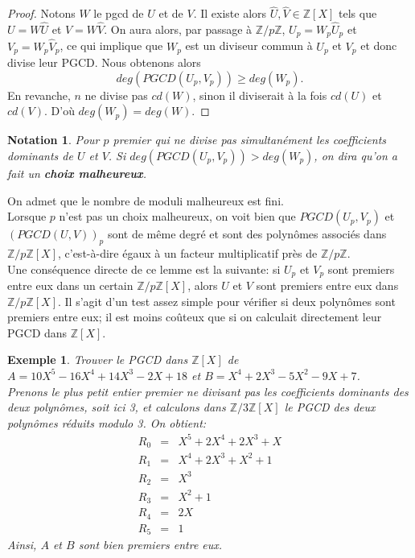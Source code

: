 \documentclass[10pt,a4paper]{report}
\newtheorem*{ex}{Exemple}
\newtheorem*{nota}{Notation}
\begin{document}
\begin{proof}
Notons $W$ le pgcd de $U$ et de $V$. Il existe alors $\widehat{U},\widehat{V} \in \mathbb{Z}[X]$ tels que $U=W\widehat{U} $ et $V=W\widehat{V}$. On aura alors, par passage à $\mathbb{Z}/p\mathbb{Z}$, $U_p=W_p\widehat{U}_p $ et $V_p=W_p\widehat{V}_p$, ce qui implique que $W_p$ est un diviseur commun à $U_p$ et $V_p$ et donc divise leur PGCD. Nous obtenons alors
$$ deg (PGCD(U_p,V_p) ) \geqslant deg (W_p).       $$
En revanche, $n$ ne divise pas $cd(W)$, sinon il diviserait à la fois $cd(U)$ et $cd(V)$. D'où $deg(W_p)=deg(W)$.
\end{proof}



\begin{nota}
Pour $p$ premier qui ne divise pas simultanément les coefficients dominants de $U$ et $V$. Si $deg (PGCD(U_p,V_p) ) > deg (W_p)$, on dira qu'on a fait un \textbf{choix malheureux}. 
\end{nota}
On admet que le nombre de moduli malheureux est fini. \\

Lorsque $p$ n'est pas un choix malheureux, on voit bien que $PGCD(U_p,V_p)$ et $(PGCD(U,V))_p$ sont de même degré et sont des polynômes associés dans $\mathbb{Z}/p\mathbb{Z}[X]$, c'est-à-dire égaux à un facteur multiplicatif près de $\mathbb{Z}/p\mathbb{Z}$. \\

Une conséquence directe de ce lemme est la suivante: si $U_p$ et $V_p$ sont premiers entre eux dans un certain $\mathbb{Z}/p\mathbb{Z}[X]$, alors $U$ et $V$ sont premiers entre eux dans $\mathbb{Z}/p\mathbb{Z}[X]$. Il s'agit d'un test assez simple pour vérifier si deux polynômes sont premiers entre eux; il est moins coûteux que si on calculait 
directement leur PGCD dans $\mathbb{Z}[X]$.

\begin{ex}
Trouver le PGCD dans $\mathbb{Z}[X]$ de $A=10X^5-16X^4 +14 X^3 -2X +18$ et $B=X^4+2X^3-5X^2-9X+7$. \\
Prenons le plus petit entier premier ne divisant pas  les coefficients dominants des deux polynômes, soit ici 3, et calculons dans $\mathbb{Z}/3 \mathbb{Z}[X]$ le PGCD des deux polynômes réduits modulo 3. On obtient:
 \begin{eqnarray*}
 R_0 &=&   X^5 +2X^4+2X^3+X \\
 R_1 &=& X^4+2X^3+X^2+1 \\
 R_2 &=& X^3 \\
 R_3 &=& X^2+1 \\
 R_4 &=& 2X \\
 R_5 &=& 1
 \end{eqnarray*}
 Ainsi, $A$ et $B$ sont bien premiers entre eux.
\end{ex}
 
\end{document}
